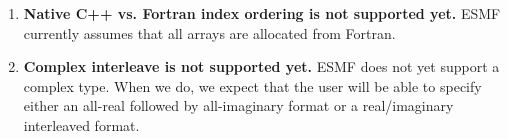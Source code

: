 

\begin{enumerate}

\item {\bf Native C++ vs. Fortran index ordering is not supported yet.}
ESMF currently assumes that all arrays are allocated from Fortran.
\item {\bf Complex interleave is not supported yet.}
ESMF does not yet support a complex type.  When we do, we expect that the
user will be able to specify either an all-real followed by all-imaginary
format or a real/imaginary interleaved format.

\end{enumerate}


